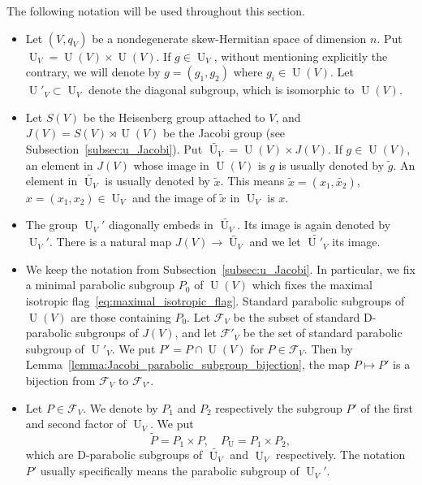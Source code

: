 \documentclass[letterpaper,11pt]{amsart}
\newcommand{\cF}{\mathcal{F}}
\newcommand{\<}{\negthickspace}
\DeclareMathOperator{\U}{U}
\theoremstyle{definition}
\theoremstyle{plain}
\theoremstyle{remark}
\numberwithin{equation}{section}
\begin{document}
The following notation will be used throughout this section.
\begin{itemize}
    \item Let $(V, q_V)$ be a nondegenerate skew-Hermitian space  of dimension $n$. Put $\U_V
        =  \U(V) \times \U(V)$. If $g \in \U_V$, without mentioning
        explicitly the contrary, we will denote by $g = (g_1, g_2)$ where
        $g_i \in \U(V)$. Let $\U'_V \subset \U_V$ denote the diagonal
        subgroup, which is isomorphic to $\U(V)$.

    \item Let $S(V)$ be the Heisenberg group attached to $V$, and $J(V) =
        S(V) \rtimes \U(V)$ be the Jacobi group (see Subsection~\ref{subsec:u_Jacobi}). Put $\widetilde{\U_V} =
        \U(V) \times J(V)$. If $g \in \U(V)$, an element in $J(V)$ whose
        image in $\U(V)$ is $g$ is usually denoted by $\widetilde{g}$.
        An element in $\widetilde{\U_V}$ is usually denoted by $\widetilde{x}$.
        This means $\widetilde{x} = (x_1, \widetilde{x_2})$,
        $x = (x_1, x_2) \in \U_V$ and the image of
        $\widetilde{x}$ in $\U_V$ is $x$.

    \item The group $\U_V'$ diagonally embeds in $\widetilde{\U_V}$.
        Its image is
        again denoted by $\U_V'$. There is a natural map $J(V) \to
        \widetilde{\U_V}$ and we let $\widetilde{\U'_V}$ its image.

    \item We keep the notation from Subsection~\ref{subsec:u_Jacobi}. In
        particular, we fix a minimal parabolic subgroup $P_0$ of $\U(V)$
        which fixes the maximal isotropic flag~\eqref{eq:maximal_isotropic_flag}.
        Standard parabolic subgroups of $\U(V)$ are those containing $P_0$.
        Let $\cF_V$ be the subset of standard
        D-parabolic subgroups of $J(V)$, and let
        $\cF'_V$ be the set of standard parabolic subgroup of $\U'_V$. We put
        $P' = P \cap \U(V)$ for $P \in \cF_V$. Then by
        Lemma~\ref{lemma:Jacobi_parabolic_subgroup_bijection}, the map
        $P \mapsto P'$ is a bijection from $\cF_V$ to $\cF_{V'}$.

    \item Let $P \in \cF_V$. We denote by $P_1$ and $P_2$ respectively
    the subgroup $P'$ of the first and second factor of $\U_V$. We put
    \begin{equation}
        \label{eq:P_tilde}
        \widetilde{P} = P_1 \times P, \quad P_{\U} = P_1 \times P_2,
    \end{equation}
     which are D-parabolic subgroups of $\widetilde{\U_V}$ and
     $\U_V$ respectively. The notation $P'$ usually specifically means
     the parabolic subgroup of $\U_V'$.


\end{itemize}
\end{document}
